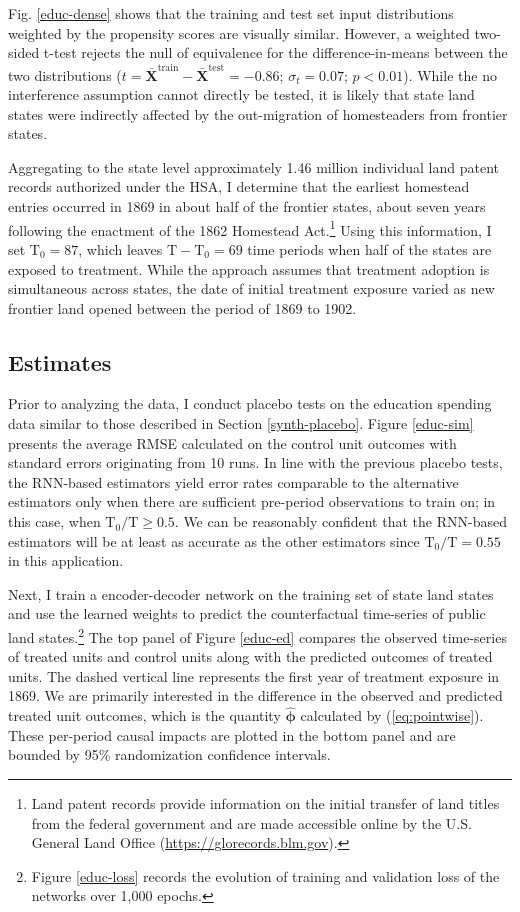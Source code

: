 \documentclass[hidelinks,12pt]{article}
\begin{document}
Fig. \ref{educ-dense} shows that the training and test set input distributions weighted by the propensity scores are visually similar. However, a weighted two-sided t-test rejects the null of equivalence for the difference-in-means between the two distributions ($t= \boldsymbol{\bar{X}}^{\text{train}} - \boldsymbol{\bar{X}}^{\text{test}} = -0.86$; $\sigma_t = 0.07$; $p < 0.01$). While the no interference assumption cannot directly be tested, it is likely that state land states were indirectly affected by the out-migration of homesteaders from frontier states. 

Aggregating to the state level approximately 1.46 million individual land patent records authorized under the HSA, I determine that the earliest homestead entries occurred in 1869 in about half of the frontier states, about seven years following the enactment of the 1862 Homestead Act.\footnote{Land patent records provide information on the initial transfer of land titles from the federal government and are made accessible online by the U.S. General Land Office (\url{https://glorecords.blm.gov}).} Using this information, I set $\text{T}_0 = 87$, which leaves $\text{T} - \text{T}_0 = 69$ time periods when half of the states are exposed to treatment. While the approach assumes that treatment adoption is simultaneous across states, the date of initial treatment exposure varied as new frontier land opened between the period of 1869 to 1902. 

\subsection{Estimates}

Prior to analyzing the data, I conduct placebo tests on the education spending data similar to those described in Section \ref{synth-placebo}. Figure \ref{educ-sim} presents the average RMSE calculated on the control unit outcomes with standard errors originating from 10 runs. In line with the previous placebo tests, the RNN-based estimators yield error rates comparable to the alternative estimators only when there are sufficient pre-period observations to train on; in this case, when $\text{T}_0/\text{T} \geq 0.5$. We can be reasonably confident that the RNN-based estimators will be at least as accurate as the other estimators since $\text{T}_0/\text{T} = 0.55$ in this application. 

Next, I train a encoder-decoder network on the training set of state land states and use the learned weights to predict the counterfactual time-series of public land states.\footnote{Figure \ref{educ-loss} records the evolution of training and validation loss of the networks over 1,000 epochs.} The top panel of Figure \ref{educ-ed} compares the observed time-series of treated units and control units along with the predicted outcomes of treated units. The dashed vertical line represents the first year of treatment exposure in 1869. We are primarily interested in the difference in the observed and predicted treated unit outcomes, which is the quantity $\boldsymbol{\hat{\phi}}$ calculated by (\ref{eq:pointwise}). These per-period causal impacts are plotted in the bottom panel and are bounded by 95\% randomization confidence intervals. 
\end{document}
